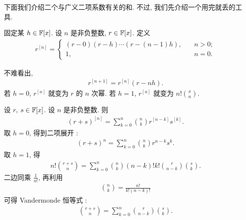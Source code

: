 下面我们介绍二个与广义二项系数有关的和. 不过, 我们先介绍一个用完就丢的工具.

\begin{definition}
    固定某 $h \in \mathbb{F}[x]$. 设 $n$ 是非负整数, $r \in \mathbb{F}[x]$. 定义
    \begin{align*}
        r^{[n]} = \begin{cases}
            (r - 0)(r - h) \cdots (r - (n-1)h), & \quad n > 0; \\
            1,                                  & \quad n = 0.
        \end{cases}
    \end{align*}
\end{definition}

不难看出,
\begin{align*}
    r^{[n+1]} = r^{[n]} (r - nh).
\end{align*}
若 $h = 0$, $r^{[n]}$ 就变为 $r$ 的 $n$ 次幂. 若 $h = 1$, $r^{[n]}$ 就变为 $n! \binom{x}{n}$.

\begin{proposition}
    设 $r$, $s \in \mathbb{F}[x]$. 设 $n$ 是非负整数. 则
    \begin{align*}
        (r + s)^{[n]} = \sum_{k = 0}^{n} \binom{n}{k} r^{[n - k]} s^{[k]}. \tag*{(\myStar)}
    \end{align*}
    取 $h = 0$, 得到二项展开 :
    \begin{align*}
        (r + s)^{n} = \sum_{k = 0}^{n} \binom{n}{k} r^{n - k} s^{k}. \tag*{(BE)}
    \end{align*}
    取 $h = 1$, 得
    \begin{align*}
        n! \binom{r + s}{n} = \sum_{k = 0}^{n} \binom{n}{k} (n - k)! k! \binom{r}{n - k} \binom{s}{k}.
    \end{align*}
    二边同乘 $\frac{1}{n!}$, 再利用
    \begin{align*}
        \binom{n}{k} = \frac{n!}{k! (n-k)!}
    \end{align*}
    可得 Vandermonde 恒等式 :
    \begin{align*}
        \binom{r + s}{n} = \sum_{k = 0}^{n} \binom{r}{n - k} \binom{s}{k}. \tag*{(VI)}
    \end{align*}
\end{proposition}

